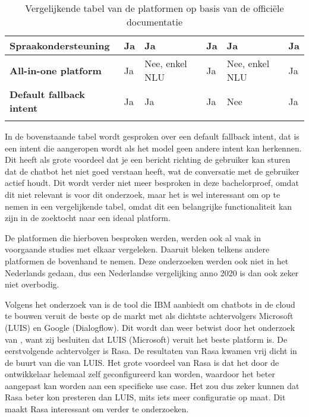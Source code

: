 \begin{center}
\begin{longtable}{| P{2.2cm} | p{2.2cm} |  p{2.2cm} | p{2.2cm} | p{2.2cm} | p{2.2cm} |}
        \textbf{Spraakondersteuning}                                   & Ja                                                                      & Ja                             & Ja                                           & Ja                                     & Ja                                            \\  \hline
        \textbf{All-in-one platform}                                   & Ja                                                                      & Nee, enkel NLU                 & Ja                                           & Nee, enkel NLU                         & Ja                                            \\  \hline
        \textbf{Default fallback intent}                               & Ja                                                                      & Ja                             & Ja                                           & Nee                                    & Ja   \\ \hline    
        \caption{Vergelijkende tabel van de platformen op basis van de officiële documentatie}                                    
    \end{longtable}
\label{tbl:platformen}
\end{center}

In de bovenstaande tabel wordt gesproken over een default fallback intent, dat is een intent die aangeropen wordt als het model geen andere intent kan herkennen. Dit heeft als grote voordeel dat je een bericht richting de gebruiker kan sturen dat de chatbot het niet goed verstaan heeft, wat de conversatie met de gebruiker actief houdt. Dit wordt verder niet meer besproken in deze bachelorproef, omdat dit niet relevant is voor dit onderzoek, maar het is wel interessant om op te nemen in een vergelijkende tabel, omdat dit een belangrijke functionaliteit kan zijn in de zoektocht naar een ideaal platform.

De platformen die hierboven besproken werden, werden ook al vaak in voorgaande studies met elkaar vergeleken. Daaruit bleken telkens andere platformen de bovenhand te nemen. Deze onderzoeken werden ook niet in het Nederlands gedaan, dus een Nederlandse vergelijking anno 2020 is dan ook zeker niet overbodig.

Volgens het onderzoek van \textcite{Russis2018} is de tool die IBM aanbiedt om chatbots in de cloud te bouwen veruit de beste op de markt met als dichtste achtervolgers Microsoft (LUIS) en Google (Dialogflow). Dit wordt dan weer betwist door het onderzoek van \textcite{Langen2017}, want zij besluiten dat LUIS (Microsoft) veruit het beste platform is. De eerstvolgende achtervolger is Rasa. De resultaten van Rasa kwamen vrij dicht in de buurt van die van LUIS. Het grote voordeel van Rasa is dat het door de ontwikkelaar helemaal zelf geconfigureerd kan worden, waardoor het beter aangepast kan worden aan een specifieke use case. Het zou dus zeker kunnen dat Rasa beter kon presteren dan LUIS, mits iets meer configuratie op maat. Dit maakt Rasa interessant om verder te onderzoeken.


